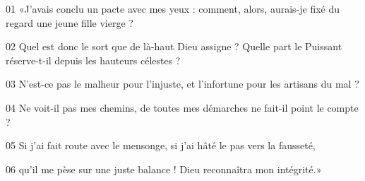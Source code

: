 01 «J’avais conclu un pacte avec mes yeux : comment, alors, aurais-je fixé du regard une jeune fille vierge ?

02 Quel est donc le sort que de là-haut Dieu assigne ? Quelle part le Puissant réserve-t-il depuis les hauteurs célestes ?

03 N’est-ce pas le malheur pour l’injuste, et l’infortune pour les artisans du mal ?

04 Ne voit-il pas mes chemins, de toutes mes démarches ne fait-il point le compte ?

05 Si j’ai fait route avec le mensonge, si j’ai hâté le pas vers la fausseté,

06 qu’il me pèse sur une juste balance ! Dieu reconnaîtra mon intégrité.»
